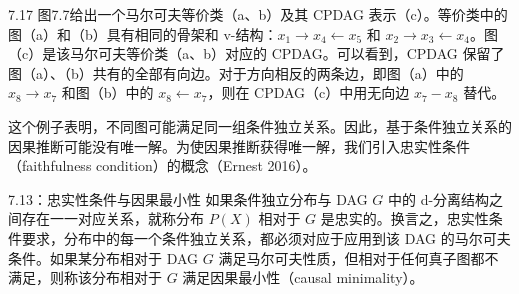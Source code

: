 \begin{bookexample}{7.17}
图7.7给出一个马尔可夫等价类（a、b）及其 CPDAG 表示（c）。等价类中的图（a）和（b）具有相同的骨架和 v-结构：$x_1\to x_4\leftarrow x_5$ 和 $x_2\to x_3\leftarrow x_4$。图（c）是该马尔可夫等价类（a、b）对应的 CPDAG。可以看到，CPDAG 保留了图（a）、（b）共有的全部有向边。对于方向相反的两条边，即图（a）中的 $x_8\to x_7$ 和图（b）中的 $x_8\leftarrow x_7$，则在 CPDAG（c）中用无向边 $x_7-x_8$ 替代。

这个例子表明，不同图可能满足同一组条件独立关系。因此，基于条件独立关系的因果推断可能没有唯一解。为使因果推断获得唯一解，我们引入忠实性条件（faithfulness condition）的概念（Ernest 2016）。
\end{bookexample}


\begin{bookdefinition}{7.13：忠实性条件与因果最小性}
如果条件独立分布与 DAG $G$ 中的 d-分离结构之间存在一一对应关系，就称分布 $P(X)$ 相对于 $G$ 是忠实的。换言之，忠实性条件要求，分布中的每一个条件独立关系，都必须对应于应用到该 DAG 的马尔可夫条件。如果某分布相对于 DAG $G$ 满足马尔可夫性质，但相对于任何真子图都不满足，则称该分布相对于 $G$ 满足因果最小性（causal minimality）。
\end{bookdefinition}

